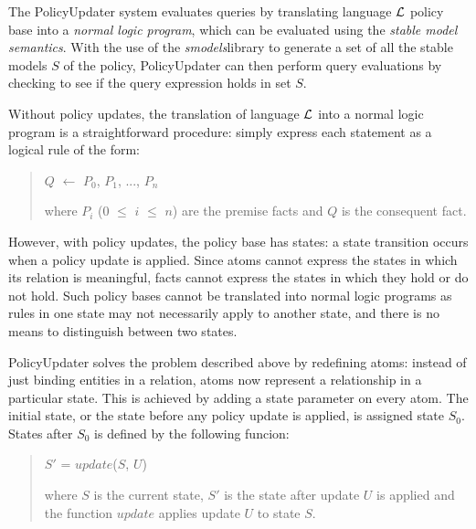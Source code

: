 \documentclass[11pt]{llncs}
\begin{document}
      The PolicyUpdater system evaluates queries by translating language
      ${\cal L}$ policy base into a {\em normal logic program}, which can be
      evaluated using the {\em stable model semantics}. With the use of the
      {\em smodels}\footnotemark library to generate a set of all the stable
      models $S$ of the policy, PolicyUpdater can then perform query
      evaluations by checking to see if the query expression holds in set $S$.


      Without policy updates, the translation of language ${\cal L}$ into a
      normal logic program is a straightforward procedure: simply express each
      statement as a logical rule of the form:

      \begin{quote}
        $Q$ $\leftarrow$ $P_{0}$, $P_{1}$, ..., $P_{n}$

        where $P_{i}$ ($0$ $\leq$ $i$ $\leq$ $n$) are the premise facts and $Q$
        is the consequent fact.
      \end{quote}

      However, with policy updates, the policy base has states: a state
      transition occurs when a policy update is applied. Since atoms cannot
      express the states in which its relation is meaningful, facts cannot
      express the states in which they hold or do not hold. Such policy bases
      cannot be translated into normal logic programs as rules in one state
      may not necessarily apply to another state, and there is no means to
      distinguish between two states.

      PolicyUpdater solves the problem described above by redefining atoms:
      instead of just binding entities in a relation, atoms now represent
      a relationship in a particular state. This is achieved by adding a state
      parameter on every atom. The initial state, or the state before any
      policy update is applied, is assigned state $S_{0}$. States after $S_{0}$
      is defined by the following funcion:

      \begin{quote}
        $S'$ = $update$($S$, $U$)

        where $S$ is the current state, $S'$ is the state after update $U$ is
        applied and the function $update$ applies update $U$ to state $S$.
      \end{quote}
\end{document}
